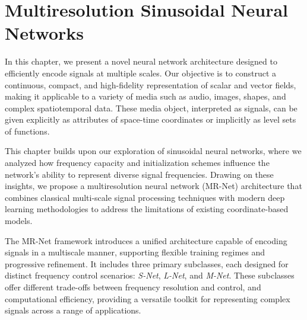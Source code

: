 \chapter{Multiresolution Sinusoidal Neural Networks}
\label{chap:mr_snn}



In this chapter, we present a novel neural network architecture designed to efficiently encode signals at multiple scales. Our objective is to construct a continuous, compact, and high-fidelity representation of scalar and vector fields, making it applicable to a variety of media such as audio, images, shapes, and complex spatiotemporal data. These media object, interpreted as signals, can be given explicitly as attributes of space-time coordinates or implicitly as level sets of functions.

This chapter builds upon our exploration of sinusoidal neural networks, where we analyzed how frequency capacity and initialization schemes influence the network's ability to represent diverse signal frequencies. Drawing on these insights, we propose a multiresolution neural network (MR-Net) architecture that combines classical multi-scale signal processing techniques with modern deep learning methodologies to address the limitations of existing coordinate-based models.

The MR-Net framework introduces a unified architecture capable of encoding signals in a multiscale manner, supporting flexible training regimes and progressive refinement. It includes three primary subclasses, each designed for distinct frequency control scenarios: \emph{S-Net}, \emph{L-Net}, and \emph{M-Net}. These subclasses offer different trade-offs between frequency resolution and control, and computational efficiency, providing a versatile toolkit for representing complex signals across a range of applications.

